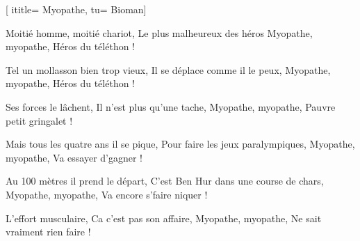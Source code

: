 [
ititle= {Myopathe},
tu= {Bioman}]

\beginverse
Moitié homme, moitié chariot,
Le plus malheureux des héros
Myopathe, myopathe,
Héros du téléthon !
\endverse

\beginverse
Tel un mollasson bien trop vieux,
Il se déplace comme il le peux,
Myopathe, myopathe,
Héros du téléthon !
\endverse

\beginverse
Ses forces le lâchent,
Il n'est plus qu'une tache,
Myopathe, myopathe,
Pauvre petit gringalet !
\endverse

\beginverse
Mais tous les quatre ans il se pique,
Pour faire les jeux paralympiques,
Myopathe, myopathe,
Va essayer d'gagner !
\endverse

\beginverse
Au 100 mètres il prend le départ,
C'est Ben Hur dans une course de chars,
Myopathe, myopathe,
Va encore s'faire niquer !
\endverse

\beginverse
L'effort musculaire,
Ca c'est pas son affaire,
Myopathe, myopathe,
Ne sait vraiment rien faire !
\endverse

\endsong
